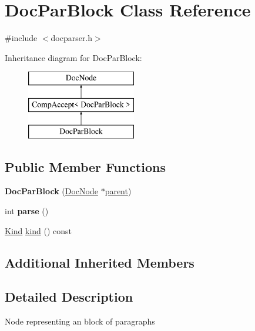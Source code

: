 \hypertarget{class_doc_par_block}{}\section{Doc\+Par\+Block Class Reference}
\label{class_doc_par_block}


{\ttfamily \#include $<$docparser.\+h$>$}

Inheritance diagram for Doc\+Par\+Block\+:\begin{figure}[H]
\begin{center}
\leavevmode
\includegraphics[height=3.000000cm]{class_doc_par_block}
\end{center}
\end{figure}
\subsection*{Public Member Functions}
\begin{DoxyCompactItemize}
\item 
\mbox{\label{class_doc_par_block_a09847c0adedc0ee390523c471b143889}} 
{\bfseries Doc\+Par\+Block} (\mbox{\hyperlink{class_doc_node}{Doc\+Node}} $\ast$\mbox{\hyperlink{class_doc_node_a73e8ad29a91cfceb0968eb00db71a23d}{parent}})
\item 
\mbox{\label{class_doc_par_block_a87bac59d6c786e1758c73c04d7b7d3cb}} 
int {\bfseries parse} ()
\item 
\mbox{\hyperlink{class_doc_node_aebd16e89ca590d84cbd40543ea5faadb}{Kind}} \mbox{\hyperlink{class_doc_par_block_a4d701db8324ba46e7dbe801bf2cbecef}{kind}} () const
\end{DoxyCompactItemize}
\subsection*{Additional Inherited Members}


\subsection{Detailed Description}
Node representing an block of paragraphs 

